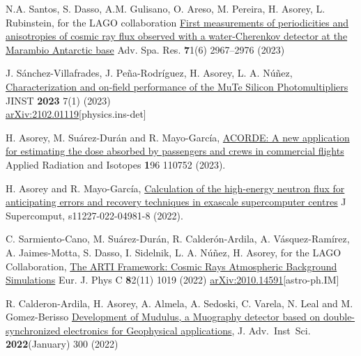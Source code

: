 \noindent
\begin{etaremune}

\item {} N.A. Santos, S. Dasso, A.M. Gulisano, O. Areso, M. Pereira, H. Asorey, L. Rubinstein, for the LAGO collaboration \href{https://doi.org/10.1016/j.asr.2022.11.041}{First measurements of periodicities and anisotropies of cosmic ray flux observed with a water-Cherenkov detector at the Marambio Antarctic base} Adv. Spa. Res. {\textbf 71}(6) 2967--2976 (2023)

\item {} J. Sánchez-Villafrades, J. Peña-Rodríguez, H. Asorey, L. A. Núñez, \href{https://doi.org/10.3390/instruments7010007}{Characterization and on-field performance of the MuTe Silicon Photomultipliers} JINST {\textbf{2023}} 7(1) (2023)\\ \href{https://arxiv.org/abs/2102.01119}{arXiv:2102.01119}[physics.ins-det]

\item {} H. Asorey, M. Suárez-Durán and R. Mayo-García, \href{https://doi.org/10.1016/j.apradiso.2023.110752}{ACORDE: A new application for estimating the dose absorbed by passengers and crews in commercial flights} Applied Radiation and Isotopes {\textbf 196} 110752 (2023).

\item {} H. Asorey and R. Mayo-García, \href{https://doi.org/10.1007/s11227-022-04981-8}{Calculation of the high-energy neutron flux for anticipating errors and recovery techniques in exascale supercomputer centres} J Supercomput, s11227-022-04981-8 (2022).

\item {} C. Sarmiento-Cano, M. Suárez-Durán, R. Calderón-Ardila, A. Vásquez-Ramírez, A. Jaimes-Motta, S. Dasso, I. Sidelnik, L. A. Núñez, H. Asorey, for the LAGO Collaboration, \href{https://doi.org/10.1140/epjc/s10052-022-10883-z}{The ARTI Framework: Cosmic Rays Atmospheric Background Simulations} Eur. J. Phys C {\textbf 82}(11) 1019 (2022) \href{https://arxiv.org/abs/2010.14591}{arXiv:2010.14591}[astro-ph.IM]

\item {} R. Calderon-Ardila, H. Asorey, A. Almela, A. Sedoski, C. Varela, N. Leal and M. Gomez-Berisso \href{http://doi.org/10.31526/jais.2022.300}{Development of Mudulus, a Muography detector based on double-synchronized electronics for Geophysical applications}, J. Adv.\ Inst\  Sci. {\textbf{2022}}(January) 300 (2022)


\end{etaremune}
